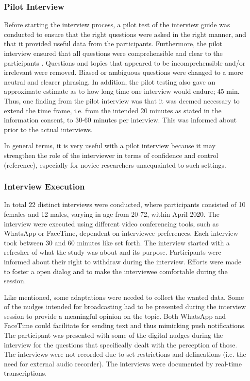         \subsubsection{Pilot Interview}
        Before starting the interview process, a pilot test of the interview guide was conducted to ensure that the right questions were asked in the right manner, and that it provided useful data from the participants. Furthermore, the pilot interview ensured that all questions were comprehensible and clear to the  participants \cite{lazar_research_2017}. Questions and topics that appeared to be incomprehensible and/or irrelevant were removed. Biased or ambiguous questions were changed to a more neutral and clearer phrasing. In addition, the pilot testing also gave an approximate estimate as to how long time one interview would endure; 45 min. Thus, one finding from the pilot interview was that it was deemed necessary to extend the time frame, i.e. from the intended 20 minutes as stated in the information consent, to 30-60 minutes per interview. This was informed about prior to the actual interviews.
        
        In general terms, it is very useful with a pilot interview because it may strengthen the role of the interviewer in terms of confidence and control \cite{lazar_research_2017} (reference), especially for novice researchers unacquainted to such settings. 
        
        \subsubsection{Interview Execution}
        In total 22 distinct interviews were conducted, where participants consisted of 10 females and 12 males, varying in age from 20-72, within April 2020. The interview were executed using different video conferencing tools, such as WhatsApp or FaceTime, dependent on interviewee preferences. Each interview took between 30 and 60 minutes like set forth. The interview started with a refresher of what the study was about and its purpose. Participants were informed about their right to withdraw during the interview. Efforts were made to foster a open dialog and to make the interviewee comfortable during the session. 
 
        Like mentioned, some adaptations were needed to collect the wanted data. Some of the nudges intended for broadcasting had to be presented during the interview session to provide a meaningful opinion on the topic. Both WhatsApp and FaceTime could facilitate for sending text and thus mimicking push notifications. The participant was presented with some of the digital nudges during the interview for the questions that specifically dealt with the perception of those. The interviews were not recorded due to set restrictions and delineations (i.e. the need for external audio recorder). The interviews were documented by real-time transcriptions. 
        

